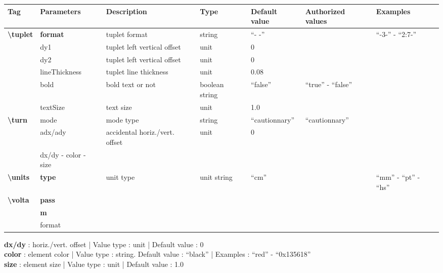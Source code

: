\documentclass[a4paper, landscape, 10pt]{article}
\begin{document}
\begin{tabularx}{\linewidth}{p{3cm}p{3cm}p{5cm}p{3cm}p{2.5cm}p{3.5cm}p{4cm}}
    \hline
    \textbf{Tag}&\textbf{Parameters}&\textbf{Description}&\textbf{Type}&\textbf{Default value}&\textbf{Authorized values}&\textbf{Examples}\\
    \hline
    \textbf{\textbackslash{}tuplet}&\textbf{format}&tuplet format&string&``- -''&&``-3-'' - ``2:7-''\\
    &dy1&tuplet left vertical offset&unit&0&&\\
    &dy2&tuplet left vertical offset&unit&0&&\\
    &lineThickness&tuplet line thickness&unit&0.08&&\\
    &bold&bold text or not&boolean string&``false''&``true'' - ``false''&\\
    &textSize&text size&unit&1.0&&\\
    \hline
    \textbf{\textbackslash{}turn}&mode&mode type&string&``cautionnary''&``cautionnary''&\\
    &adx/ady&accidental horiz./vert. offset&unit&0&&\\
    &dx/dy - color - size&&&&&\\
    \hline
    \textbf{\textbackslash{}units}&\textbf{type}&unit type&unit string&``cm''&&``mm'' - ``pt'' - ``hs''\\
    \hline
    \textbf{\textbackslash{}volta}&\textbf{pass}&&&&&\\ %
    &\textbf{m}&&&&&\\
    &format&&&&&\\
    \hline
\end{tabularx}

\bigskip

\textbf{dx/dy} : horiz./vert. offset | Value type : unit | Default value : 0\\
\textbf{color} : element color | Value type : string. Default value : ``black'' | Examples : ``red'' - ``0x135618''\\
\textbf{size} : element size | Value type : unit | Default value : 1.0\\
    
\end{document}
